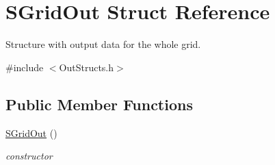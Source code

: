 \hypertarget{struct_s_grid_out}{}\section{S\+Grid\+Out Struct Reference}
\label{struct_s_grid_out}


Structure with output data for the whole grid.  




{\ttfamily \#include $<$Out\+Structs.\+h$>$}

\subsection*{Public Member Functions}
\begin{DoxyCompactItemize}
\item 
\mbox{\hyperlink{struct_s_grid_out_a18aaa89470973872eabd14ca01e1e27d}{S\+Grid\+Out}} ()
\begin{DoxyCompactList}\small\item\em constructor \end{DoxyCompactList}\end{DoxyCompactItemize}
